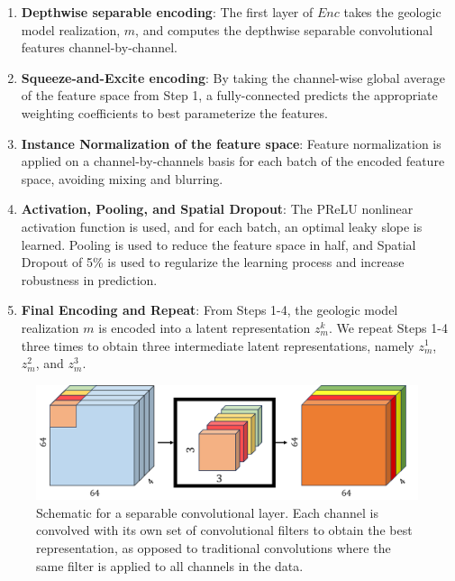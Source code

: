 \documentclass[10pt, twoside]{article}
\begin{document}
\begin{enumerate}[Step 1:]
    \item \textbf{Depthwise separable encoding}: The first layer of $Enc$ takes the geologic model realization, $m$, and computes the depthwise separable convolutional features channel-by-channel.

    \item \textbf{Squeeze-and-Excite encoding}: By taking the channel-wise global average of the feature space from Step 1, a fully-connected predicts the appropriate weighting coefficients to best parameterize the features.

    \item \textbf{Instance Normalization of the feature space}: Feature normalization is applied on a channel-by-channels basis for each batch of the encoded feature space, avoiding mixing and blurring.

    \item \textbf{Activation, Pooling, and Spatial Dropout}: The PReLU nonlinear activation function is used, and for each batch, an optimal leaky slope is learned. Pooling is used to reduce the feature space in half, and Spatial Dropout of 5\% is used to regularize the learning process and increase robustness in prediction.

    \item \textbf{Final Encoding and Repeat}: From Steps 1-4, the geologic model realization $m$ is encoded into a latent representation $z_m^k$. We repeat Steps 1-4 three times to obtain three intermediate latent representations, namely $z_m^1$, $z_m^2$, and $z_m^3$.
\end{enumerate}

\begin{figure}[h]
    \centering
    \includegraphics[width=12cm]{figures/sepconv.png}
    \caption{Schematic for a separable convolutional layer. Each channel is convolved with its own set of convolutional filters to obtain the best representation, as opposed to traditional convolutions where the same filter is applied to all channels in the data.}
    \label{sepconv}
\end{figure}
\end{document}
